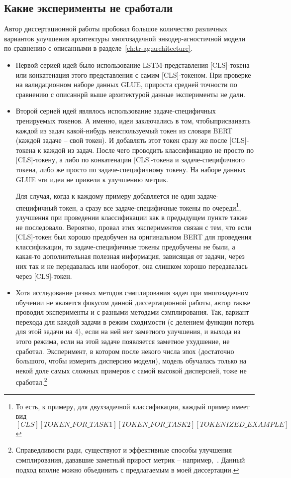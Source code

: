 \subsection{Какие эксперименты не сработали}\label{ch:tr-ag:failed_attempts} 
Автор диссертационной работы пробовал большое количество различных вариантов улучшения архитектуры многозадачной энкодер-агностичной модели по сравнению с описанными в разделе~\ref{ch:tr-ag:architecture}.
\begin{itemize} 
 \item Первой серией идей было использование LSTM-представления [CLS]-токена или конкатенация этого представления с самим [CLS]-токеном. При проверке на валидационном наборе данных GLUE, прироста средней точности по сравнению с описаннрй выше архитектурой данные эксперименты не дали. 
\item Второй серией идей являлось использование задаче-специфичных тренируемых токенов. А именно, идеи заключались в том, чтобыприсваивать каждой из задач какой-нибудь неиспользуемый токен из словаря BERT (каждой задаче -- свой токен). И добавлять этот токен сразу же после [CLS]-токена к каждой из задач. После чего проводить классификацию не просто по [CLS]-токену, а либо по конкатенации [CLS]-токена и задаче-специфичного токена, либо же просто по задаче-специфичному токену. На наборе данных GLUE эти идеи не привели к улучшению метрик.

 Для случая, когда к каждому примеру добавляется не один задаче-специфичный токен, а сразу все задаче-специфичные токены по очереди\footnote{То есть, к примеру, для двухзадачной классификации, каждый пример имеет вид \textit{$[CLS] [TOKEN\_FOR\_TASK1] [TOKEN\_FOR\_TASK2][TOKENIZED\_EXAMPLE]$}}, улучшения при проведении классификации как в предыдущем пункте также не последовало. 
Вероятно, провал этих экспериментов связан с тем, что если [CLS]-токен был хорошо предобучен на оригинальном BERT для проведения классификации, то задаче-специфичные токены предобучены не были, а какая-то дополнительная полезная информация, зависящая от задачи, через них так и не передавалась или наоборот, она слишком хорошо передавалась через [CLS]-токен. 

\item Хотя исследование разных методов сэмплирования задач при многозадачном обучении не является фокусом данной диссертационной работы, автор также проводил эксперименты и с разными методами сэмплирования. Так, вариант перехода для каждой задачи в режим сходимости (с делением функции потерь для этой задачи на 4), если на ней нет заметного улучшения, и выхода из этого режима, если на этой задаче появляется заметное ухудшение, не сработал. Эксперимент, в котором после некого числа эпох (достаточно большого, чтобы измерить дисперсию модели), модель обучалась только на некой доле самых сложных примеров с самой высокой дисперсией, тоже не сработал.\footnote{Справедливости ради, существуют и эффективные способы улучшения сэмплирования, дававшие заметный прирост метрик -- например,~\cite{GradTS}. Данный подход вполне можно объединить с предлагаемым в моей диссертации.}
\end{itemize}

